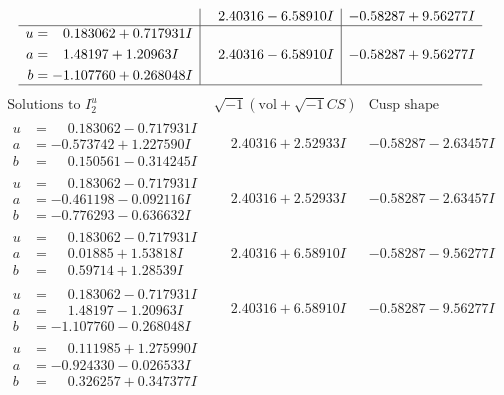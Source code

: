 \documentclass[1p]{elsarticle_modified}
\theoremstyle{definition}
\newcommand{\I}{\sqrt{-1}}
\begin{document}
$$\begin{array}{c|c|c}
 & \phantom{-}2.40316 - 6.58910 I & -0.58287 + 9.56277 I \\ \hline\begin{aligned}
u &= \phantom{-}0.183062 + 0.717931 I \\
a &= \phantom{-}1.48197 + 1.20963 I \\
b &= -1.107760 + 0.268048 I\end{aligned}
 & \phantom{-}2.40316 - 6.58910 I & -0.58287 + 9.56277 I\\
 \hline 
 \end{array}$$\newpage$$\begin{array}{c|c|c}  
\text{Solutions to }I^u_{2}& \I (\text{vol} + \sqrt{-1}CS) & \text{Cusp shape}\\
 \hline 
\begin{aligned}
u &= \phantom{-}0.183062 - 0.717931 I \\
a &= -0.573742 + 1.227590 I \\
b &= \phantom{-}0.150561 - 0.314245 I\end{aligned}
 & \phantom{-}2.40316 + 2.52933 I & -0.58287 - 2.63457 I \\ \hline\begin{aligned}
u &= \phantom{-}0.183062 - 0.717931 I \\
a &= -0.461198 - 0.092116 I \\
b &= -0.776293 - 0.636632 I\end{aligned}
 & \phantom{-}2.40316 + 2.52933 I & -0.58287 - 2.63457 I \\ \hline\begin{aligned}
u &= \phantom{-}0.183062 - 0.717931 I \\
a &= \phantom{-}0.01885 + 1.53818 I \\
b &= \phantom{-}0.59714 + 1.28539 I\end{aligned}
 & \phantom{-}2.40316 + 6.58910 I & -0.58287 - 9.56277 I \\ \hline\begin{aligned}
u &= \phantom{-}0.183062 - 0.717931 I \\
a &= \phantom{-}1.48197 - 1.20963 I \\
b &= -1.107760 - 0.268048 I\end{aligned}
 & \phantom{-}2.40316 + 6.58910 I & -0.58287 - 9.56277 I \\ \hline\begin{aligned}
u &= \phantom{-}0.111985 + 1.275990 I \\
a &= -0.924330 - 0.026533 I \\
b &= \phantom{-}0.326257 + 0.347377 I\end{aligned}

\end{array}$$
\end{document}
